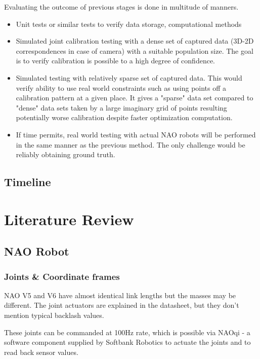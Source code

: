\documentclass[english, printversion, nomenclature, notitle]{tuvisionthesis} %
\begin{document}
Evaluating the outcome of previous stages is done in multitude of manners.

\begin{itemize}
	\item Unit tests or similar tests to verify data storage, computational methods
	\item Simulated joint calibration testing with a dense set of captured data (3D-2D correspondences in case of camera) with a suitable population size.
	\subitem The goal is to verify calibration is possible to a high degree of confidence.
	\item Simulated testing with relatively sparse set of captured data. This would verify ability to use real world constraints such as using points off a calibration pattern at a given place. It gives a "sparse" data set compared to "dense" data sets taken by a large imaginary grid of points resulting potentially worse calibration despite faster optimization computation.
	\item If time permits, real world testing with actual NAO robots will be performed in the same manner as the previous method. The only challenge would be reliably obtaining ground truth.
\end{itemize}

\section{Timeline}

\chapter{Literature Review}

\section{NAO Robot}

\subsection{Joints \& Coordinate frames}
NAO V5 and V6 have almost identical link lengths but the masses may be different. The joint actuators are explained in the datasheet, but they don't mention typical backlash values. 

These joints can be commanded at 100Hz rate, which is possible via NAOqi - a software component supplied by Softbank Robotics to actuate the joints and to read back sensor values.
\end{document}
